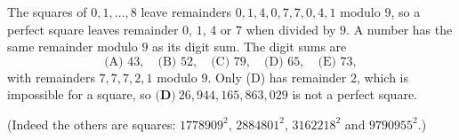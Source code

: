 The squares of $0,1,\dots,8$ leave remainders $0,1,4,0,7,7,0,4,1$ modulo $9$, so a perfect square leaves remainder $0$, $1$, $4$ or $7$ when divided by $9$. A number has the same remainder modulo $9$ as its digit sum. The digit sums are
\[
\text{(A) }43,\quad\text{(B) }52,\quad\text{(C) }79,\quad\text{(D) }65,\quad\text{(E) }73,
\]
with remainders $7,7,7,2,1$ modulo $9$. Only (D) has remainder $2$, which is impossible for a square, so $\textbf{(D)}\ \boxed{26{,}944{,}165{,}863{,}029}$ is not a perfect square.

(Indeed the others are squares: $1778909^2$, $2884801^2$, $3162218^2$ and $9790955^2$.)
